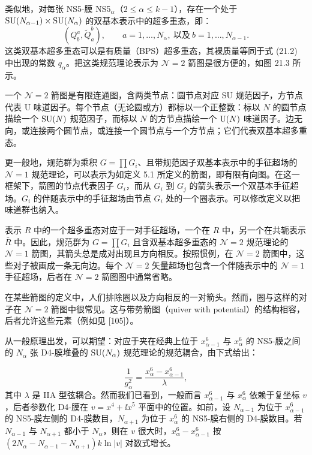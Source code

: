 类似地，对每张 NS5-膜 NS5$_\alpha$（$2\le\alpha\le k-1$），存在一个处于 $\operatorname{SU}(N_{\alpha-1})\times\operatorname{SU}(N_\alpha)$ 的双基本表示中的超多重态，即：
\[
(Q^a_b,\tilde Q^b_a),\qquad a=1,\dots,N_\alpha,\ \text{以及}\ b=1,\dots,N_{\alpha-1}.
\]
这类双基本超多重态可以是有质量（BPS）超多重态，其裸质量等同于式 (21.2) 中出现的常数 $q_\alpha$。把这类规范理论表示为 $\mathcal{N}=2$ 箭图是很方便的，如图 21.3 所示。


\begin{definition}[21.4] 一个 $\mathcal{N}=2$ 箭图是有限连通图，含两类节点：圆节点对应 SU 规范因子，方节点代表 U 味道因子。每个节点（无论圆或方）都标以一个正整数：标以 $N$ 的圆节点描绘一个 $\operatorname{SU}(N)$ 规范因子，而标以 $N$ 的方节点描绘一个 $\operatorname{U}(N)$ 味道因子。边无向，或连接两个圆节点，或连接一个圆节点与一个方节点；它们代表双基本超多重态。\end{definition}

更一般地，规范群为乘积 $G=\prod G_i$、且带规范因子双基本表示中的手征超场的 $\mathcal{N}=1$ 规范理论，可以表示为如定义 5.1 所定义的箭图，即有限有向图。在这一框架下，箭图的节点代表因子 $G_i$，而从 $G_i$ 到 $G_j$ 的箭头表示一个双基本手征超场。$G_i$ 的伴随表示中的手征超场由节点 $G_i$ 处的一个圈表示。可以修改定义以把味道群也纳入。

表示 $R$ 中的一个超多重态对应于一对手征超场，一个在 $R$ 中，另一个在共轭表示 $\bar R$ 中。因此，规范群为 $G=\prod G_i$ 且含双基本超多重态的 $\mathcal{N}=2$ 规范理论的 $\mathcal{N}=1$ 箭图，其箭头总是成对出现且方向相反。按照惯例，在 $\mathcal{N}=2$ 箭图中，这些对子被画成一条无向边。每个 $\mathcal{N}=2$ 矢量超场也包含一个伴随表示中的 $\mathcal{N}=1$ 手征超场，后者在 $\mathcal{N}=2$ 箭图图中通常省略。

在某些箭图的定义中，人们排除圈以及方向相反的一对箭头。然而，圈与这样的对子在 $\mathcal{N}=2$ 箭图中很常见。这与带势箭图（quiver with potential）的结构相容，后者允许这些元素（例如见 [105]）。

从一般原理出发，可以期望：对应于夹在经典上位于 $x^6_{\alpha-1}$ 与 $x^6_\alpha$ 的 NS5-膜之间的 $N_\alpha$ 张 D4-膜堆叠的 $\operatorname{SU}(N_\alpha)$ 规范理论的规范耦合，由下式给出：

\begin{equation}
\frac{1}{g_\alpha^2}=\frac{x^6_\alpha-x^6_{\alpha-1}}{\lambda},
\tag{21.3}
\end{equation}
其中 $\lambda$ 是 IIA 型弦耦合。然而我们已看到，一般而言 $x^6_{\alpha-1}$ 与 $x^6_\alpha$ 依赖于复坐标 $v$，后者参数化 D4-膜在 $v=x^4+\ii x^5$ 平面中的位置。如前，设 $N_{\alpha-1}$ 为位于 $x^6_{\alpha-1}$ 的 NS5-膜左侧的 D4-膜数目，$N_{\alpha+1}$ 为位于 $x^6_\alpha$ 的 NS5-膜右侧的 D4-膜数目。若 $N_{\alpha-1}$ 与 $N_{\alpha+1}$ 都小于 $N_\alpha$，则在 $v$ 很大时，$x^6_\alpha-x^6_{\alpha-1}$ 按 $(2N_\alpha-N_{\alpha-1}-N_{\alpha+1})k\ln|v|$ 对数式增长。

